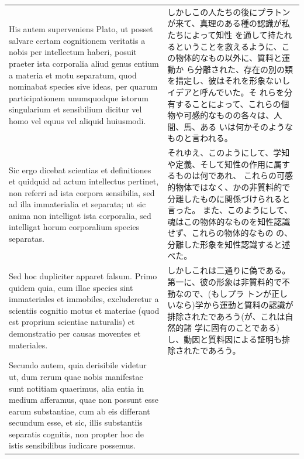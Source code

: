 \documentclass[paper=a4paper,fontsize=10pt,jafontsize=9pt,titlepage]{jlreq}
\begin{document}
\begin{longtable}{p{21em}p{21em}}
 His autem superveniens Plato, ut posset salvare certam cognitionem
 veritatis a nobis per intellectum haberi, posuit praeter ista corporalia aliud
 genus entium a materia et motu separatum, quod nominabat species sive ideas,
 per quarum participationem unumquodque istorum singularium et sensibilium
 dicitur vel homo vel equus vel aliquid huiusmodi.

 &

 しかしこの人たちの後にプラトンが来て、真理のある種の認識が私たちによって知性
 を通して持たれるということを救えるように、この物体的なもの以外に、質料と運動か
 ら分離された、存在の別の類を措定し、彼はそれを形象ないしイデアと呼んでいた。そ
 れらを分有することによって、これらの個物や可感的なものの各々は、人間、馬、ある
 いは何かそのようなものと言われる。
 
\\[1em]

 Sic ergo dicebat scientias et definitiones et quidquid ad actum intellectus
 pertinet, non referri ad ista corpora sensibilia, sed ad illa immaterialia et
 separata; ut sic anima non intelligat ista corporalia, sed intelligat horum
 corporalium species separatas.

 &

 それゆえ、このようにして、学知や定義、そして知性の作用に属するものは何であれ、
 これらの可感的物体ではなく、かの非質料的で分離したものに関係づけられると言った。
 また、このようにして、魂はこの物体的なものを知性認識せず、これらの物体的なもの
 の、分離した形象を知性認識すると述べた。
 
\\[1em]


 Sed hoc dupliciter apparet falsum. Primo quidem quia, cum illae species sint
 immateriales et immobiles, excluderetur a scientiis cognitio motus et materiae
 (quod est proprium scientiae naturalis) et demonstratio per causas moventes et
 materiales.

 &

 しかしこれは二通りに偽である。第一に、彼の形象は非質料的で不動なので、(もしプラ
 トンが正しいなら)学から運動と質料の認識が排除されたであろう(が、これは自然的諸
 学に固有のことである)し、動因と質料因による証明も排除されたであろう。

\\[1em]

 Secundo autem, quia derisibile videtur ut, dum rerum
 quae nobis manifestae sunt notitiam quaerimus, alia entia in medium afferamus,
 quae non possunt esse earum substantiae, cum ab eis differant secundum esse, et
 sic, illis substantiis separatis cognitis, non propter hoc de istis
 sensibilibus iudicare possemus.


\end{longtable}
\end{document}
